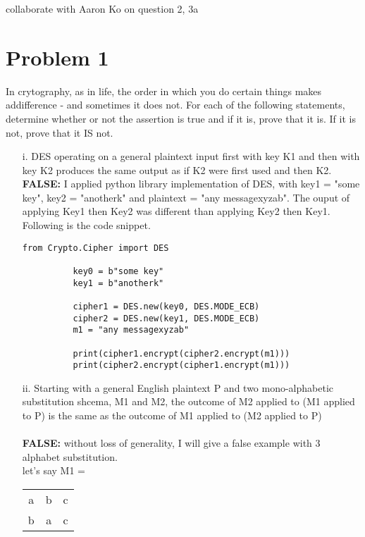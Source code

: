 \documentclass[12pt,letterpaper]{article}
\begin{document}
    collaborate with Aaron Ko on question 2, 3a
\section*{Problem 1}
    In crytography, as in life, the order in which you do certain things makes addifference - and sometimes it does not. For each of the following statements, determine whether or not the assertion is true and if it is, prove that it is. If it is not, prove that it IS not.
    \begin{enumerate}
        \item [i.] 
        DES operating on a general plaintext input first with key K1 and then with key K2 produces the same output as if K2 were first used and then K2.\\
        
        \textbf{FALSE: } I applied python library implementation of DES, with key1 = "some key", key2 = "anotherk" and plaintext = "any messagexyzab". The ouput of applying Key1 then Key2 was different than applying Key2 then Key1.  Following is the code snippet.
        \begin{lstlisting}[style = Python]
          from Crypto.Cipher import DES

          key0 = b"some key"
          key1 = b"anotherk"
            
          cipher1 = DES.new(key0, DES.MODE_ECB)
          cipher2 = DES.new(key1, DES.MODE_ECB)
          m1 = "any messagexyzab"
        
          print(cipher1.encrypt(cipher2.encrypt(m1)))
          print(cipher2.encrypt(cipher1.encrypt(m1)))
        \end{lstlisting}
        \item[ii.] 
        Starting with a general English plaintext P and two mono-alphabetic substitution shcema, M1 and M2, the outcome of M2 applied to (M1 applied to P) is the same as the outcome of M1 applied to (M2 applied to P)\\\\
        \textbf{FALSE: } without loss of generality, I will give a false example with 3 alphabet substitution. \\
        let's say M1 = 
        \begin{tabular}{ c c c }
         a & b & c \\ 
         b & a & c \\  
        \end{tabular}\\


\end{enumerate}
\end{document}
